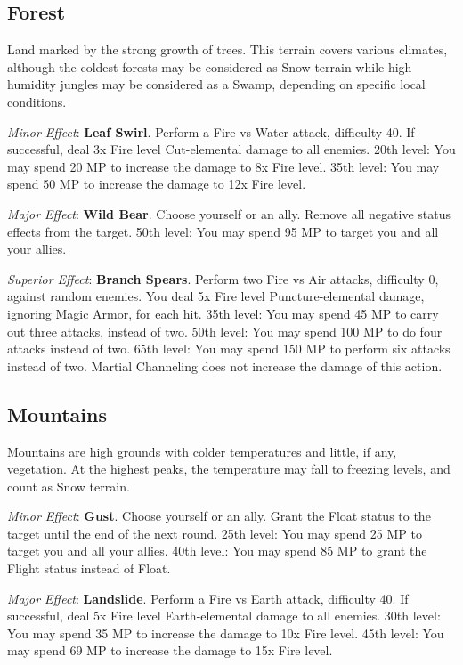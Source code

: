 \begin{multicols}{2}
\subsection*{Forest}\label{subsec:geo-forest}
Land marked by the strong growth of trees. This terrain covers various climates, although the coldest forests may be considered as Snow terrain while high humidity jungles may be considered as a Swamp, depending on specific local conditions.

\textit{Minor Effect}: \textbf{Leaf Swirl}. Perform a Fire vs Water attack, difficulty 40. If successful, deal 3x Fire level Cut-elemental damage to all enemies. 20th level: You may spend 20 MP to increase the damage to 8x Fire level. 35th level: You may spend 50 MP to increase the damage to 12x Fire level.

\textit{Major Effect}: \textbf{Wild Bear}. Choose yourself or an ally. Remove all negative status effects from the target. 50th level: You may spend 95 MP to target you and all your allies.

\textit{Superior Effect}: \textbf{Branch Spears}. Perform two Fire vs Air attacks, difficulty 0, against random enemies. You deal 5x Fire level Puncture-elemental damage, ignoring Magic Armor, for each hit. 35th level: You may spend 45 MP to carry out three attacks, instead of two. 50th level: You may spend 100 MP to do four attacks instead of two. 65th level: You may spend 150 MP to perform six attacks instead of two. Martial Channeling does not increase the damage of this action.

\subsection*{Mountains}\label{subsec:geo-mountain}
Mountains are high grounds with colder temperatures and little, if any, vegetation. At the highest peaks, the temperature may fall to freezing levels, and count as Snow terrain.

\textit{Minor Effect}: \textbf{Gust}. Choose yourself or an ally. Grant the Float status to the target until the end of the next round. 25th level: You may spend 25 MP to target you and all your allies. 40th level: You may spend 85 MP to grant the Flight status instead of Float.

\textit{Major Effect}: \textbf{Landslide}. Perform a Fire vs Earth attack, difficulty 40. If successful, deal 5x Fire level Earth-elemental damage to all enemies. 30th level: You may spend 35 MP to increase the damage to 10x Fire level. 45th level: You may spend 69 MP to increase the damage to 15x Fire level.


\end{multicols}
